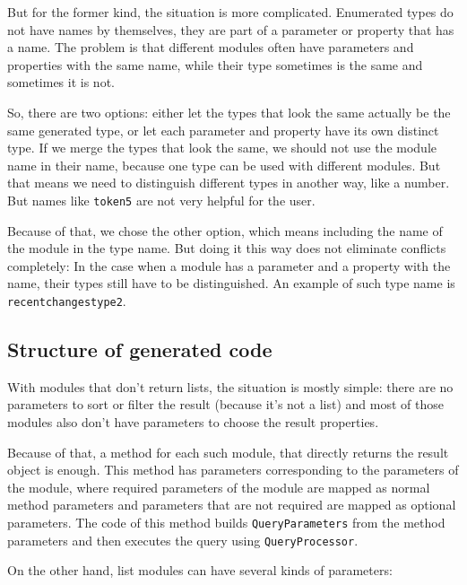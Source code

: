 But for the former kind, the situation is more complicated.
Enumerated types do not have names by themselves, they are part of a parameter or property that has a name.
The problem is that different modules often have parameters and properties with the same name,
while their type sometimes is the same and sometimes it is not.

So, there are two options: either let the types that look the same actually be the same generated type,
or let each parameter and property have its own distinct type.
If we merge the types that look the same, we should not use the module name in their name,
because one type can be used with different modules.
But that means we need to distinguish different types in another way, like a number.
But names like \lstinline{token5} are not very helpful for the user.

Because of that, we chose the other option, which means including the name of the module in the type name.
But doing it this way does not eliminate conflicts completely:
In the case when a module has a parameter and a property with the name,
their types still have to be distinguished.
An example of such type name is \lstinline{recentchangestype2}.

\subsection{Structure of generated code}


With modules that don't return lists, the situation is mostly simple:
there are no parameters to sort or filter the result (because it's not a list)
and most of those modules also don't have parameters to choose the result properties.

Because of that, a method for each such module, that directly returns the result object is enough.
This method has parameters corresponding to the parameters of the module,
where required parameters of the module are mapped as normal method parameters
and parameters that are not required are mapped as optional parameters.
The code of this method builds \lstinline{QueryParameters} from the method parameters
and then executes the query using \lstinline{QueryProcessor}.

\medskip

On the other hand, list modules can have several kinds of parameters:

